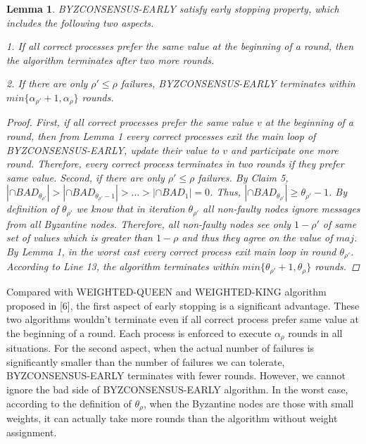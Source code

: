 \documentclass[conference]{IEEEtran}
\newtheorem{l1}{Lemma}
\begin{document}
\begin{l1}
BYZCONSENSUS-EARLY satisfy early stopping property, which includes the following two aspects. 

1. If all correct processes prefer the same value at the beginning of a round,  then the algorithm terminates after two more rounds.

2. If there are only $\rho' \leq \rho$ failures,  BYZCONSENSUS-EARLY terminates within $min\{\alpha_{\rho'} + 1, \alpha_\rho\}$ rounds. 
\begin{proof}
First, if all correct processes prefer the same value $v$ at the beginning of a round, then from Lemma 1 every correct processes exit the main loop of BYZCONSENSUS-EARLY, update their value to $v$ and participate one more round. Therefore, every correct process terminates in two rounds if they prefer same value. 
Second, if there are only $\rho' \leq \rho$ failures. By Claim 5, $|\cap BAD_{\theta_{\rho'}}| > | \cap BAD_{\theta_{\rho'} - 1}| > ... > |\cap BAD_1| = 0$. Thus, $|\cap BAD_{\theta_{\rho'}}| \geq \theta_{\rho'} - 1$. By definition of $\theta_{\rho'}$ we know that in iteration $\theta_{\rho'}$ all non-faulty nodes ignore messages from all Byzantine nodes. Therefore, all non-faulty nodes see only $1 - {\rho'}$ of same set of values which is greater than $1 - \rho$ and thus they agree on the value of $maj$. By Lemma 1, in the worst cast every correct process exit main loop in round $\theta_{\rho'}$. According to Line 13, the algorithm terminates within $min\{\theta_{\rho'} + 1, \theta_\rho\}$ rounds.
\end{proof}
\end{l1}

Compared with WEIGHTED-QUEEN and WEIGHTED-KING algorithm proposed in [6], the first aspect of early stopping is a significant advantage. These two algorithms wouldn't terminate even if all correct process prefer same value at the beginning of a round. Each process is enforced to execute $\alpha_\rho$ rounds in all situations. For the second aspect, when the actual number of failures is significantly smaller than the number of failures we can tolerate, BYZCONSENSUS-EARLY terminates with fewer rounds. However, we cannot ignore the bad side of BYZCONSENSUS-EARLY algorithm. In the worst case, according to the definition of $\theta_\rho$, when the Byzantine nodes are those with small weights, it can actually take more rounds than the algorithm without weight assignment. 
\end{document}
